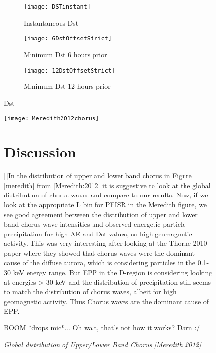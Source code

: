 \documentclass{article}
\newcounter{para}
\newcommand\mypara{\par\refstepcounter{para}\textbf{[\thepara]}\space}
\begin{document}
\begin{figure}
    \centering
    \begin{subfigure}[h]{0.3\linewidth}        %
        \centering
        \texttt{[image: DSTinstant]}
        \caption{Instantaneous Dst}
        \label{fig:dst:a}
    \end{subfigure}
    \begin{subfigure}[h]{0.3\linewidth}        %
        \centering
        \texttt{[image: 6DstOffsetStrict]}
        \caption{Minimum Dst 6 hours prior}
        \label{fig:dst:b}
    \end{subfigure}
       \begin{subfigure}[h]{0.3\linewidth}        %
        \centering
        \texttt{[image: 12DstOffsetStrict]}
        \caption{Minimum Dst 12 hours prior}
        \label{fig:dst:c}
    \end{subfigure}
    \caption{Dst}
    \label{fig:dst}
\end{figure}



\begin{figure}[h] %
	\texttt{[image: Meredith2012chorus]} %
	\caption[Short caption]{\textit{Global distribution of Upper/Lower Band Chorus [Meredith 2012]}}
	\label{fig:meredith}
\section{Discussion}
\mypara In the distribution of upper and lower band chorus in Figure \ref{meredith} from [Meredith:2012] it is suggestive to look at the global distribution of chorus waves and compare to our results. Now, if we look at the appropriate L bin for PFISR in the Meredith figure, we see good agreement between the distribution of upper and lower band chorus wave intensities and observed energetic particle precipitation for high AE and Dst values, so high geomagnetic activity. This was very interesting after looking at the Thorne 2010 paper where they showed that chorus waves were the dominant cause of the diffuse aurora, which is considering particles in the 0.1-30 keV energy range. But EPP in the D-region is considering looking at energies > 30 keV and the distribution of precipitation still seems to match the distribution of chorus waves, albeit for high geomagnetic activity. Thus Chorus waves are the dominant cause of EPP. 

BOOM *drops mic*... Oh wait, that's not how it works? Darn :/
\end{figure}
\end{document}
